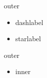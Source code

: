 \documentclass{article}
\begin{document}
\begin{list}{}{}
\item outer
\begin{itemize}[label=--]
\item dashlabel
\end{itemize}
\end{list}
\begin{trivlist}
\item
\begin{itemize}[label=$\star$]
\item starlabel
\end{itemize}
\end{trivlist}
\begin{list}{}{}
\item outer
\begin{itemize}
\item inner
\end{itemize}
\end{list}
\end{document}
